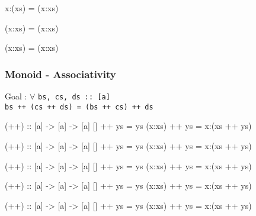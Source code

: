 \documentclass{beamer}
\newcommand{\ca}[1]{{\color{blue}#1}}
\newcommand{\cb}[1]{{\color{violet}#1}}
\newcommand{\cc}[1]{{\color{red}#1}}
\begin{document}
\begin{frame}[t,fragile]
\begin{center}
\begin{overprint}
\begin{semiverbatim}
x:(\alert{xs})       = (x:xs)
\end{semiverbatim}

\begin{semiverbatim}
\alert{(x:xs)}       = \alert{(x:xs)}
\end{semiverbatim}

\begin{semiverbatim}
(x:xs)       = (x:xs)
\end{semiverbatim}

\end{overprint}
\end{center}

\end{frame}

\begin{frame}[t,fragile]
    \frametitle {Monoid - Associativity}

\begingroup
\color{gray}\fontsize{10}{9.8}\selectfont

Goal : $\forall$ \verb?bs, cs, ds :: [a]? \\
    \quad \alert<3,17>{\Verb?bs ++ (cs ++ ds) = (bs ++ cs) ++ ds?}

\vspace{10pt}

\begin{overprint}

\begin{semiverbatim}
(++) :: [a] -> [a] -> [a]
[]     ++ ys = ys
(x:xs) ++ ys = x:(xs ++ ys)
\end{semiverbatim}

\begin{semiverbatim}
(++) :: [a] -> [a] -> [a]
\ca{[]}     ++ \cb{ys} = ys
(x:xs) ++ ys = x:(xs ++ ys)
\end{semiverbatim}

\begin{semiverbatim}
(++) :: [a] -> [a] -> [a]
\ca{[]}     ++ \cb{ys} = \cb{ys}
(x:xs) ++ ys = x:(xs ++ ys)
\end{semiverbatim}

\begin{semiverbatim}
(++) :: [a] -> [a] -> [a]
[]     ++ ys = ys
(\ca{x}:\cb{xs}) ++ \cc{ys} = x:(xs ++ ys)
\end{semiverbatim}

\begin{semiverbatim}
(++) :: [a] -> [a] -> [a]
[]     ++ ys = ys
(\ca{x}:\cb{xs}) ++ \cc{ys} = \ca{x}:(\cb{xs} ++ \cc{ys})
\end{semiverbatim}


\end{overprint}
\end{frame}
\end{document}
